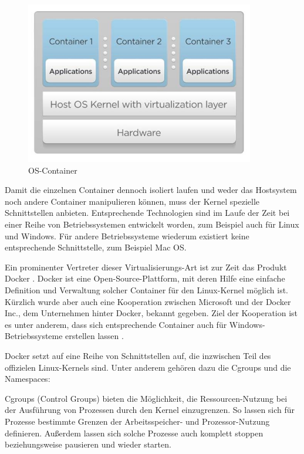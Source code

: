 \begin{figure}[!ht]
  \begin{center}
    \includegraphics[width=10cm]{bilder/lxc-architecture.jpg}
    \caption{OS-Container \citep{Francis2014}}
    \label{container}
  \end{center}
\end{figure}

Damit die einzelnen Container dennoch isoliert laufen und weder das Hostsystem noch andere Container manipulieren können, muss der Kernel spezielle Schnittstellen anbieten. Entsprechende Technologien sind im Laufe der Zeit bei einer Reihe von Betriebssystemen entwickelt worden, zum Beispiel auch für Linux und Windows. Für andere Betriebssysteme wiederum existiert keine entsprechende Schnittstelle, zum Beispiel Mac OS.

Ein prominenter Vertreter dieser Virtualisierungs-Art ist zur Zeit das Produkt Docker \citep[Vgl.][]{docker:002}. Docker ist eine Open-Source-Plattform, mit deren Hilfe eine einfache Definition und Verwaltung solcher Container für den Linux-Kernel möglich ist. Kürzlich wurde aber auch eine Kooperation zwischen Microsoft und der Docker Inc., dem Unternehmen hinter Docker, bekannt gegeben. Ziel der Kooperation ist es unter anderem, dass sich entsprechende Container auch für Windows-Betriebssysteme erstellen lassen \citep[Vgl.][]{heise:001}.

Docker setzt auf eine Reihe von Schnittstellen auf, die inzwischen Teil des offizielen Linux-Kernels sind. Unter anderem gehören dazu die Cgroups und die Namespaces:

Cgroups (Control Groups) \citep[Vgl.][S. 3]{Schee14} bieten die Möglichkeit, die Ressourcen-Nutzung bei der Ausführung von Prozessen durch den Kernel einzugrenzen. So lassen sich für Prozesse bestimmte Grenzen der Arbeitsspeicher- und Prozessor-Nutzung definieren. Außerdem lassen sich solche Prozesse auch komplett stoppen beziehungsweise pausieren und wieder starten.


